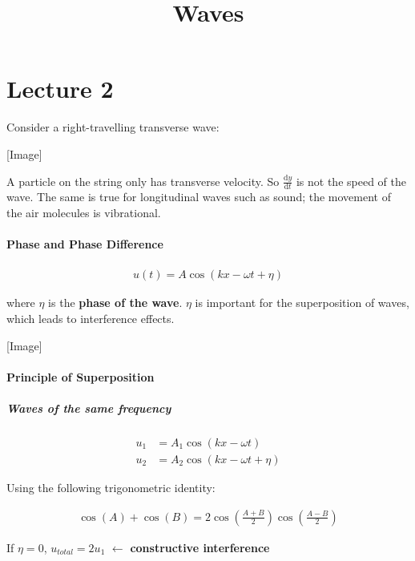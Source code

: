 \documentclass[10pt,a4paper]{article}
\title{Waves}
\begin{document}
\part*{Lecture 2}

Consider a right-travelling transverse wave:

\vspace*{10pt}
[Image]
\vspace*{10pt}

A particle on the string only has transverse velocity. So $\frac{\mathrm{d}y}{\mathrm{d}t}$ is not the speed of the wave. The same is true for longitudinal waves such as sound; the movement of the air molecules is vibrational.

\subsection*{Phase and Phase Difference}

\begin{align*}
u(t) = A \cos(kx - \omega t + \eta)
\end{align*}

where $\eta$ is the \textbf{phase of the wave}. $\eta$ is important for the superposition of waves, which leads to interference effects.

\vspace*{10pt}
[Image]
\vspace*{10pt}

\subsection*{Principle of Superposition}

\subsubsection*{Waves of the same frequency}

\begin{align*}
u_1 &= A_1 \cos(kx - \omega t) \\
u_2 &= A_2 \cos(kx - \omega t + \eta)
\end{align*}

Using the following trigonometric identity:

\begin{align*}
\cos(A) + \cos(B) = 2 \cos\left(\frac{A+B}{2}\right) \cos\left(\frac{A-B}{2}\right)
\end{align*}

If $\eta = 0$, $u_{total} = 2 u_1$ $\leftarrow$ \textbf{constructive interference}
\end{document}

